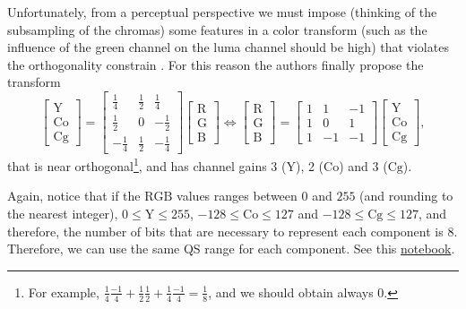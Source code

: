 Unfortunately, from a perceptual perspective we must impose (thinking
of the subsampling of the chromas) some features in a color transform
(such as the influence of the green channel on the luma channel should
be high) that violates the orthogonality constrain
\cite{malvar2008lifting}. For this reason the authors finally propose
the transform
\begin{equation}
  \begin{bmatrix}
    \text{Y} \\
    \text{Co} \\
    \text{Cg}
  \end{bmatrix}
  =
  \begin{bmatrix}
    \frac{1}{4} &  \frac{1}{2}  &  \frac{1}{4} \\ 
    \frac{1}{2} &            0  & -\frac{1}{2} \\
    -\frac{1}{4} &  \frac{1}{2}  & -\frac{1}{4}
  \end{bmatrix}
  \begin{bmatrix}
    \text{R} \\
    \text{G} \\
    \text{B}
  \end{bmatrix}
  \Leftrightarrow
  \begin{bmatrix}
    \text{R} \\
    \text{G} \\
    \text{B}
  \end{bmatrix}
  =
  \begin{bmatrix}
    1  &  1  & -1 \\ 
    1  &  0  &  1 \\ 
    1  & -1  & -1
  \end{bmatrix}
  \begin{bmatrix}
    \text{Y} \\
    \text{Co} \\
    \text{Cg}
  \end{bmatrix},
\end{equation}
that is near orthogonal\footnote{For example, $\frac{1}{4}\frac{-1}{4}
+ \frac{1}{2}\frac{1}{2} + \frac{1}{4}\frac{-1}{4} = \frac{1}{8}$, and
we should obtain always 0.}, and has channel gains 3 ($\text{Y}$), 2
($\text{Co}$) and 3 ($\text{Cg}$). %

Again, notice that if the $\text{RGB}$ values ranges between $0$
and $255$ (and rounding to the nearest integer), $0\le\text{Y}\le 255$,
$-128\le\text{Co}\le 127$ and $-128\le\text{Cg}\le 127$, and
therefore, the number of bits that are necessary to represent each
component is $8$. Therefore, we can use the same QS range for each
component. See this \href{https://github.com/Sistemas-Multimedia/Sistemas-Multimedia.github.io/blob/master/milestones/06-YUV_compression/YCrCb_matrix.ipynb}{notebook}.

